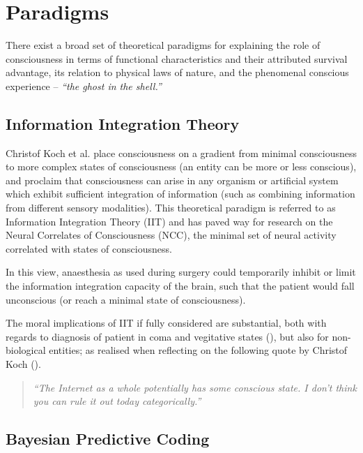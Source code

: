 \section{Paradigms}

There exist a broad set of theoretical paradigms for explaining the role of consciousness in terms of functional characteristics and their attributed survival advantage, its relation to physical laws of nature, and the phenomenal conscious experience -- \textit{``the ghost in the shell.''}

\subsection{Information Integration Theory}

Christof Koch et al. \cite{foo} place consciousness on a gradient from minimal consciousness to more complex states of consciousness (an entity can be more or less conscious), and proclaim that consciousness can arise in any organism or artificial system which exhibit sufficient integration of information (such as combining information from different sensory modalities). This theoretical paradigm is referred to as Information Integration Theory (IIT) and has paved way for research on the Neural Correlates of Consciousness (NCC), the minimal set of neural activity correlated with states of consciousness.

In this view, anaesthesia as used during surgery could temporarily inhibit or limit the information integration capacity of the brain, such that the patient would fall unconscious (or reach a minimal state of consciousness).

The moral implications of IIT if fully considered are substantial, both with regards to diagnosis of patient in coma and vegitative states (), but also for non-biological entities; as realised when reflecting on the following quote by Christof Koch ().

\begin{quote}
	\textit{``The Internet as a whole potentially has some conscious state. I don't think you can rule it out today categorically.''}
\end{quote}

\subsection{Bayesian Predictive Coding}


